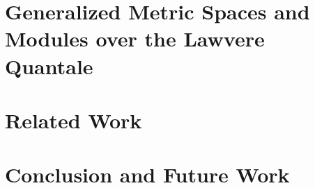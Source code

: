 \documentclass[conference]{IEEEtran}
\begin{document}
\section{Generalized Metric Spaces and Modules over the Lawvere Quantale}\label{section6}
%


\section{Related Work}\label{section7}



\section{Conclusion and Future Work}\label{section8}




\end{document}
